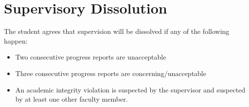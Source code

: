 \section{Supervisory Dissolution}
	The student agrees that supervision will be dissolved if any of the following happen:
	\begin{itemize}
	\item Two consecutive progress reports are unacceptable
	\item Three consecutive progress reports are concerning/unacceptable
	\item An academic integrity violation is suspected by the supervisor and suspected by at least one other faculty member.
	\end{itemize}
	